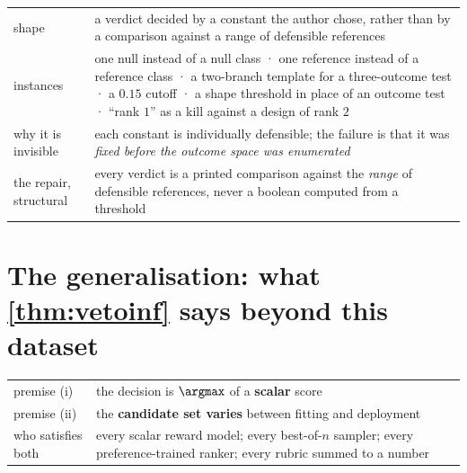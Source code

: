\begin{table}[H]\centering\small
\begin{tabularx}{\textwidth}{P{3.6cm}Y}
\toprule
shape & a verdict decided by a constant the author chose, rather than by a
comparison against a range of defensible references\\
instances & one null instead of a null class · one reference instead of a
reference class · a two-branch template for a three-outcome test · a $0.15$
cutoff · a shape threshold in place of an outcome test · ``rank $1$'' as a kill
against a design of rank $2$\\
why it is invisible & each constant is individually defensible; the failure is
that it was \emph{fixed before the outcome space was enumerated}\\
the repair, structural & every verdict is a printed comparison against the
\emph{range} of defensible references, never a boolean computed from a threshold\\
\bottomrule
\end{tabularx}
\end{table}


\section{The generalisation: what \texorpdfstring{\cref{thm:vetoinf}}{the veto theorem} says beyond this dataset}
\label{sec:general}


\begin{table}[H]\centering\small
\begin{tabularx}{\textwidth}{P{3.2cm}Y}
\toprule
premise (i) & the decision is $\argmax$ of a \textbf{scalar} score\\
premise (ii) & the \textbf{candidate set varies} between fitting and deployment\\
\midrule
who satisfies both & every scalar reward model; every best-of-$n$ sampler; every
preference-trained ranker; every rubric summed to a number\\
\bottomrule
\end{tabularx}
\end{table}

